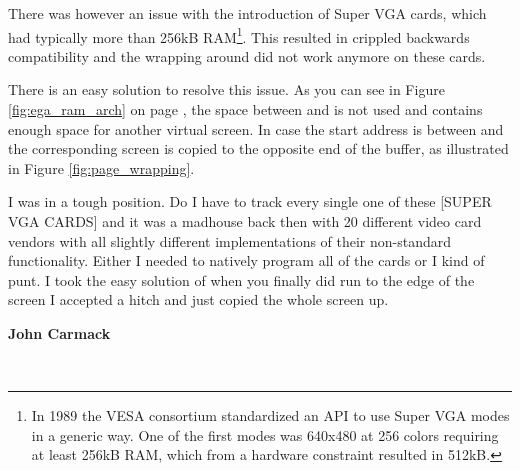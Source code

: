 \documentclass[book.tex]{subfiles}
\begin{document}
There was however an issue with the introduction of Super VGA cards, which had typically more than 256kB RAM\footnote{In 1989 the VESA consortium standardized an API to use Super VGA modes in a generic way. One of the first modes was 640x480 at 256 colors requiring at least 256kB RAM, which from a hardware constraint resulted in 512kB.}. This resulted in crippled backwards compatibility and the wrapping around  did not work anymore on these cards. \\
\par
There is an easy solution to resolve this issue. As you can see in Figure \ref{fig:ega_ram_arch} on page \pageref{fig:ega_ram_arch}, the space between  and  is not used and contains enough space for another virtual screen. In case the start address is between  and  the corresponding screen is copied to the opposite end of the buffer, as illustrated in Figure \ref{fig:page_wrapping}.\\

\par

\begin{fancyquotes}
I was in a tough position. Do I have to track every single one of these [SUPER VGA CARDS] and it was a madhouse back then with 20 different video card vendors with all slightly different implementations of their non-standard functionality. Either I needed to natively program all of the cards or I kind of punt. I took the easy solution of when you finally did run to the edge of the screen I accepted a hitch and just copied the whole screen up.\\
\par
\textbf{John Carmack\protect\footnotemark}
\end{fancyquotes}\\
\addtocounter{footnote}{-1}
\end{document}
